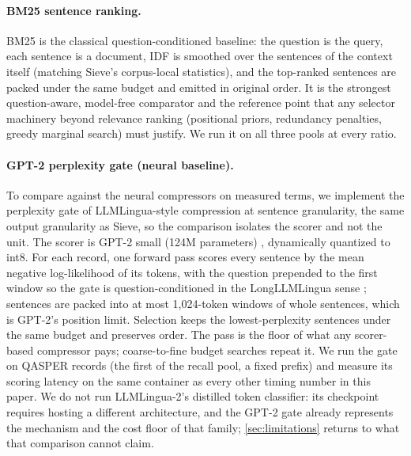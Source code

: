 \documentclass[review,12pt]{elsarticle}
\theoremstyle{remark}
\newcommand{\method}{Sieve}
\begin{document}
\paragraph{BM25 sentence ranking.}
BM25 \citep{robertson2009bm25} is the classical question-conditioned
baseline: the question is the query, each sentence is a document, IDF
is smoothed over the sentences of the context itself (matching
\method{}'s corpus-local statistics), and the top-ranked sentences are
packed under the same budget and emitted in original order. It is the
strongest question-aware, model-free comparator and the reference
point that any selector machinery beyond relevance ranking
(positional priors, redundancy penalties, greedy marginal search)
must justify. We run it on all three pools at every ratio.

\paragraph{GPT-2 perplexity gate (neural baseline).}
To compare against the neural compressors on measured terms, we
implement the perplexity gate of LLMLingua-style compression
\citep{jiang2023llmlingua} at sentence granularity, the same output
granularity as \method{}, so the comparison isolates the scorer and
not the unit. The scorer is GPT-2 small (124M parameters)
\citep{radford2019gpt2}, dynamically quantized to int8. For each
record, one forward pass scores every sentence by the mean negative
log-likelihood of its tokens, with the question prepended to the
first window so the gate is question-conditioned in the LongLLMLingua
sense \citep{jiang2023longllmlingua}; sentences are packed into at
most 1{,}024-token windows of whole sentences, which is GPT-2's
position limit. Selection keeps the lowest-perplexity sentences under
the same budget and preserves order. The pass is the floor of what
any scorer-based compressor pays; coarse-to-fine budget searches
repeat it. We run the gate on \GateN{} QASPER records (the first
\GateN{} of the recall pool, a fixed prefix) and measure its scoring
latency on the same container as every other timing number in this
paper. We do not run LLMLingua-2's distilled token classifier: its
checkpoint requires hosting a different architecture, and the GPT-2
gate already represents the mechanism and the cost floor of that
family; \autoref{sec:limitations} returns to what that comparison
cannot claim.
\end{document}
